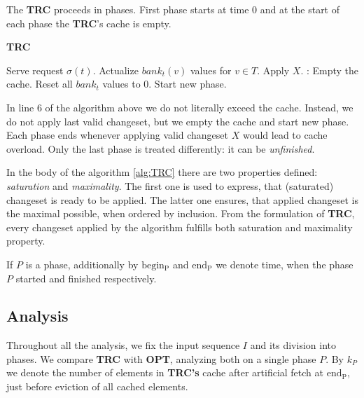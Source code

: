 The \textbf{TRC} proceeds in phases. First phase starts at time 0 and at the 
start of each phase the \textbf{TRC}'s cache is empty. 
\begin{algorithm}
\caption{\textbf{TRC}}
\label{alg:TRC}
\begin{algorithmic}[1]
  \State Serve request $\sigma(t)$.
  \State Actualize $bank_t(v)$ values for $v \in T$.
 \State Apply $X$.
 :
  \State Empty the cache.
  \State Reset all $bank_t$ values to 0.
  \State Start new phase.
 \EndIf
 \EndIf
\EndFor
  \end{algorithmic}
\end{algorithm}

In line 6 of the algorithm above we do not literally exceed the cache. Instead, 
we do not apply last valid changeset, but we empty the cache and start new 
phase. Each phase ends whenever applying valid changeset $X$ would lead to cache 
overload. Only the last phase is treated differently: it can be \textit{unfinished}. 

In the body of the algorithm \ref{alg:TRC} there are two properties defined: 
\textit{saturation} and \textit{maximality}. The first one is used to express, 
that (saturated) changeset is ready to be applied. The latter one ensures, that
applied changeset is the maximal possible, when ordered by inclusion. From the 
formulation of \textbf{TRC}, every changeset applied by the algorithm fulfills
both saturation and maximality property.

If $P$ is a phase, additionally by $\mathrm{begin_P}$ and $\mathrm{end_P}$ we 
denote time, when the phase $P$ started and finished respectively.

\subsection{Analysis}
Throughout all the analysis, we fix the input sequence $I$ and its division into 
phases. We compare \textbf{TRC} with \textbf{OPT}, analyzing both on a single 
phase $P$. By $k_P$ we denote the number of elements in \textbf{TRC's} cache 
after artificial fetch at $\mathrm{end_P}$, just before eviction of all cached 
elements.


